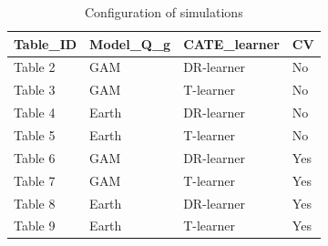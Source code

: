 \documentclass[
]{article}
\begin{document}
\begin{table}

\caption{\label{tab:unnamed-chunk-5}Configuration of simulations}
\centering
\fontsize{10}{12}\selectfont
\begin{tabular}[t]{llll}
\toprule
Table\_ID & Model\_Q\_g & CATE\_learner & CV\\
\midrule
Table 2 & GAM & DR-learner & No\\
Table 3 & GAM & T-learner & No\\
Table 4 & Earth & DR-learner & No\\
Table 5 & Earth & T-learner & No\\
\addlinespace
Table 6 & GAM & DR-learner & Yes\\
Table 7 & GAM & T-learner & Yes\\
Table 8 & Earth & DR-learner & Yes\\
Table 9 & Earth & T-learner & Yes\\
\bottomrule
\end{tabular}
\end{table}
\end{document}
